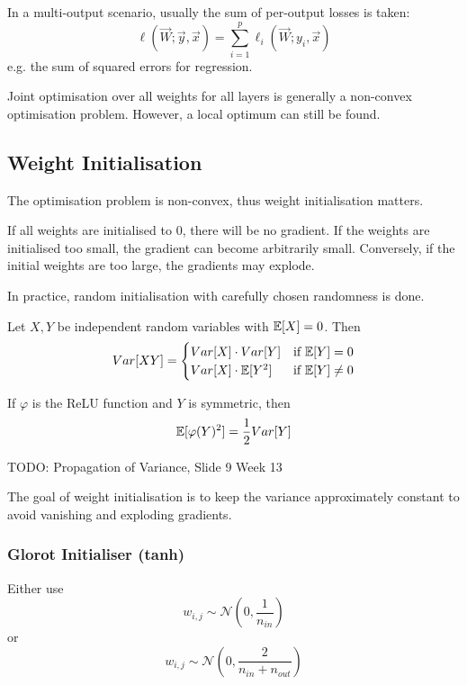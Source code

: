 In a multi-output scenario, usually the sum of per-output
losses is taken:
\begin{equation*}
\ell(\vec{W}; \vec{y}, \vec{x}) =
\sum_{i=1}^p{\ell_i(\vec{W}; y_i, \vec{x})}
\end{equation*}
e.g. the sum of squared errors for regression.

Joint optimisation over all weights for all layers is
generally a non-convex optimisation problem.
However, a local optimum can still be found.


\subsection{Weight Initialisation}
The optimisation problem is non-convex,
thus weight initialisation matters.

If all weights are initialised to $0$,
there will be no gradient.
If the weights are initialised too small,
the gradient can become arbitrarily small.
Conversely, if the initial weights are too large,
the gradients may explode.

In practice, random initialisation with carefully chosen
randomness is done.

\begin{theorem}
	Let $X, Y$ be independent random variables with
	$\mathbb{E}[X] = 0$. Then
	\begin{equation*}
	Var[X Y] =
	\begin{cases}
	Var[X] \cdot Var[Y] & \text{if $\mathbb{E}[Y] = 0$} \\
	Var[X] \cdot \mathbb{E}[Y^2] & \text{if $\mathbb{E}[Y] \neq 0$}
	\end{cases}
	\end{equation*}
	
	If $\varphi$ is the ReLU function and $Y$ is symmetric, then
	\begin{equation*}
	\mathbb{E}[\varphi(Y)^2] = \frac{1}{2} Var[Y]
	\end{equation*}
\end{theorem}

TODO: Propagation of Variance, Slide 9 Week 13

The goal of weight initialisation is to keep the variance
approximately constant to avoid vanishing and exploding gradients.

\subsubsection{Glorot Initialiser (tanh)}
Either use
\begin{equation*}
w_{i,j} \sim \mathcal{N}\left(0, \frac{1}{n_{in}}\right)
\end{equation*}
or
\begin{equation*}
w_{i,j} \sim \mathcal{N}\left(0, \frac{2}{n_{in} + n_{out}}\right)
\end{equation*}

